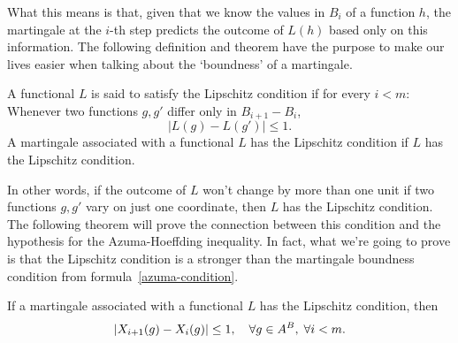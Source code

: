 What this means is that, given that we know the values in $B_i$ of a function $h$, the martingale at the $i$-th step predicts the outcome of $L(h)$ based only on this information. The following definition and theorem have the purpose to make our lives easier when talking about the `boundness' of a martingale.

\begin{definition}
    A functional $L$ is said to satisfy the Lipschitz condition if for every $i < m$: Whenever two functions $g, g'$ differ only in $B_{i+1}- B_i$,
    \[ |L(g) - L(g')| \leq 1. \]
    A martingale associated with a functional $L$ has the Lipschitz condition if $L$ has the Lipschitz condition.
\end{definition}

In other words, if the outcome of $L$ won't change by more than one unit if two functions $g, g'$ vary on just one coordinate, then $L$ has the Lipschitz condition. The following theorem will prove the connection between this condition and the hypothesis for the Azuma-Hoeffding inequality. In fact, what we're going to prove is that the Lipschitz condition is a stronger than the martingale boundness condition from formula~\ref{azuma-condition}.

\begin{theorem}\label{lipschitz-condition}
    If a martingale associated with a functional $L$ has the Lipschitz condition, then
    \[ |X_{i+1}(g)- X_i(g)| \leq 1,\hspace*{1em} \forall g\in A^B,\; \forall i < m. \] 
\end{theorem}

